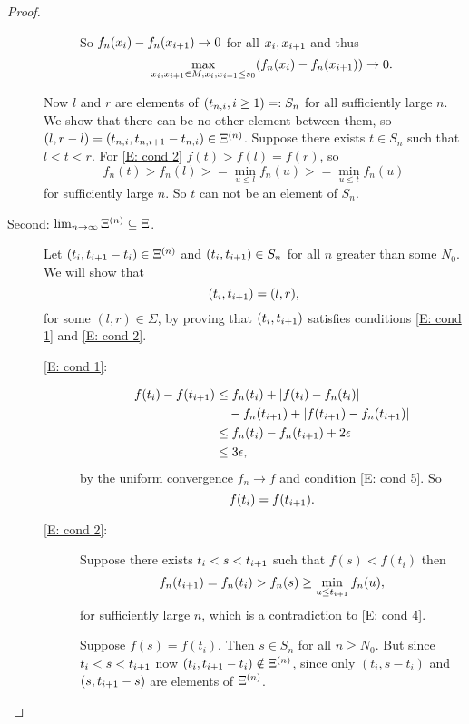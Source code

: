 \begin{proof}
\begin{description}
\begin{description}
So $f_n(x_i) - f_n(x_{i+1}) \rightarrow 0$ for all $x_i, x_{i+1}$ and thus 
\begin{equation*}
\max_{x_i, x_{i+1} \in M, x_i, x_{i+1} \leq s_0} (f_n(x_i) - f_n(x_{i+1})) \rightarrow 0.
\end{equation*}
\end{description} %
Now $l$ and $r$ are elements of $(t_{n, i}, i \geq 1) =: S_n$ for all sufficiently large $n$.
We show that there can be no other element between them, 
so $(l, r-l) = (t_{n, i}, t_{n, i+1} - t_{n, i}) \in \Xi^{(n)}$.
Suppose there exists $t \in S_n$ such that $l < t < r$.
For \ref{E: cond 2} $f(t) > f(l) = f(r)$, so
\begin{equation*}
f_n(t) > f_n(l) >= \min_{u \leq l} f_n(u) >= \min_{u \leq t} f_n(u)
\end{equation*}
for sufficiently large $n$. So $t$ can not be an element of $S_n$.

\item[Second: $\lim_{n \rightarrow \infty} \Xi^{(n)} \subseteq \Xi$.]
Let $(t_i, t_{i+1} - t_i) \in \Xi^{(n)}$ and $(t_i, t_{i+1}) \in S_n$
for all $n$ greater than some $N_0$.
We will show that
\begin{equation}
(t_i, t_{i+1} ) = (l,r),
\end{equation}
for some $(l,r) \in \Sigma$,
by proving that $(t_i, t_{i+1})$ satisfies conditions \ref{E: cond 1} and \ref{E: cond 2}.


\begin{description} %
	\item[\ref{E: cond 1}:]
\begin{equation}
\begin{aligned}
f(t_i) - f(t_{i+1}) 
&\leq f_n(t_i) + |f(t_i) - f_n(t_i)| \\
&\quad- f_n(t_{i+1}) + |f(t_{i+1}) - f_n(t_{i+1})| \\
&\leq f_n(t_i) - f_n(t_{i+1}) + 2\epsilon \\
&\leq 3\epsilon,
\end{aligned}
\end{equation}
by the uniform convergence $f_n \rightarrow f$ and condition \ref{E: cond 5}.
So
\begin{equation}
f(t_i) = f(t_{i+1}).
\end{equation}

	\item[\ref{E: cond 2}:]
Suppose there exists $t_i < s < t_{i+1}$ such that
$f(s) < f(t_i)$
then
\begin{equation*}
f_n(t_{i+1}) = f_n(t_i) > f_n(s) \geq \min_{u \leq t_{i+1}}f_n(u),
\end{equation*}
for sufficiently large $n$, which is a contradiction to \ref{E: cond 4}.

Suppose $f(s) = f(t_i)$. Then $s \in S_n$ for all $n \geq N_0$.
But since $t_i < s < t_{i+1}$ now $(t_i, t_{i+1} - t_i) \notin \Xi^{(n)}$,
since only $(t_i, s - t_i)$ and $(s, t_{i+1} - s)$ are elements of $\Xi^{(n)}$.
\end{description} %
\end{description} %
\end{proof}
